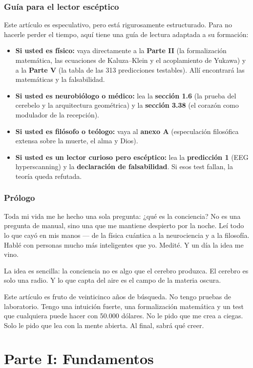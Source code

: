\documentclass[11pt,a4paper]{article}
\begin{document}
\section*{Guía para el lector escéptico}
Este artículo es especulativo, pero está rigurosamente estructurado. Para no hacerle perder el tiempo, aquí tiene una guía de lectura adaptada a su formación:
\begin{itemize}
    \item \textbf{Si usted es físico:} vaya directamente a la \textbf{Parte II} (la formalización matemática, las ecuaciones de Kaluza--Klein y el acoplamiento de Yukawa) y a la \textbf{Parte V} (la tabla de las 313 predicciones testables). Allí encontrará las matemáticas y la falsabilidad.
    \item \textbf{Si usted es neurobiólogo o médico:} lea la \textbf{sección 1.6} (la prueba del cerebelo y la arquitectura geométrica) y la \textbf{sección 3.38} (el corazón como modulador de la recepción).
    \item \textbf{Si usted es filósofo o teólogo:} vaya al \textbf{anexo A} (especulación filosófica extensa sobre la muerte, el alma y Dios).
    \item \textbf{Si usted es un lector curioso pero escéptico:} lea la \textbf{predicción 1} (EEG hyperscanning) y la \textbf{declaración de falsabilidad}. Si esos test fallan, la teoría queda refutada.
\end{itemize}

\section*{Prólogo}
Toda mi vida me he hecho una sola pregunta: ¿qué es la conciencia? No es una pregunta de manual, sino una que me mantiene despierto por la noche. Leí todo lo que cayó en mis manos --- de la física cuántica a la neurociencia y a la filosofía. Hablé con personas mucho más inteligentes que yo. Medité. Y un día la idea me vino.

La idea es sencilla: la conciencia no es algo que el cerebro produzca. El cerebro es solo una radio. Y lo que capta del aire es el campo de la materia oscura.

Este artículo es fruto de veinticinco años de búsqueda. No tengo pruebas de laboratorio. Tengo una intuición fuerte, una formalización matemática y un test que cualquiera puede hacer con 50.000 dólares. No le pido que me crea a ciegas. Solo le pido que lea con la mente abierta. Al final, sabrá qué creer.

\newpage
\part*{Parte I: Fundamentos}
\end{document}
